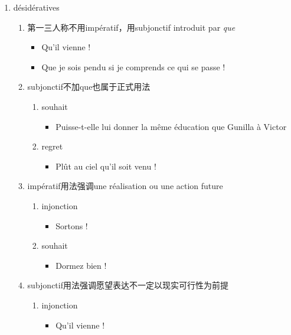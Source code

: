 \documentclass[UTF8]{report}
\begin{document}
\begin{enumerate}
    \item désidératives
    \begin{enumerate}
        \item 第一三人称不用impératif，用subjonctif introduit par \textit{que}
        \begin{itemize}
            \item Qu’il vienne !
            \item Que je sois pendu si je comprends ce qui se passe !
        \end{itemize}
        \item subjonctif不加que也属于正式用法
        \begin{enumerate}
            \item souhait
            \begin{itemize}
                \item Puisse-t-elle lui donner la même éducation que Gunilla à Victor
            \end{itemize}
            \item regret
            \begin{itemize}
                \item Plût au ciel qu’il soit venu !
            \end{itemize}
        \end{enumerate}
        \item impératif用法强调une réalisation ou une action future
        \begin{enumerate}
            \item injonction
            \begin{itemize}
                \item Sortons !
            \end{itemize}
            \item souhait
            \begin{itemize}
                \item Dormez bien !
            \end{itemize}
        \end{enumerate}
        \item subjonctif用法强调愿望表达不一定以现实可行性为前提
        \begin{enumerate}
            \item injonction
            \begin{itemize}
                \item Qu’il vienne !

\end{itemize}
\end{enumerate}
\end{enumerate}
\end{enumerate}
\end{document}
